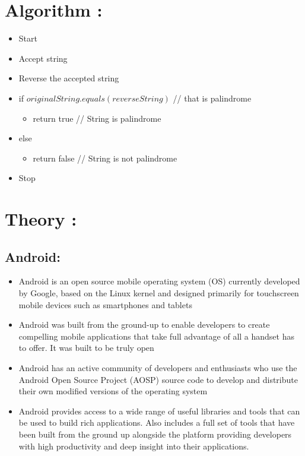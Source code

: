\documentclass{article}
\begin{document}
\section{Algorithm : }
	\begin{itemize}
		\item Start
        \item Accept string
        \item Reverse the accepted string
        \item if $originalString.equals(reverseString)$ // that is palindrome
        	\begin{itemize}
					\item return  true // String is palindrome
			\end{itemize}
        \item else
        	\begin{itemize}
					\item return  false // String is not palindrome
			\end{itemize}
        \item Stop
	\end{itemize}


\section{Theory : }
 	
\subsection{Android:}
	\begin{itemize}
		\item Android is an open source mobile operating system (OS) currently developed by Google, based on the Linux kernel and designed primarily for touchscreen mobile devices such as smartphones and tablets
        \item Android was built from the ground-up to enable developers to create compelling mobile applications that take full advantage of all a handset has to offer. It was built to be truly open
        \item Android has an active community of developers and enthusiasts who use the Android Open Source Project (AOSP) source code to develop and distribute their own modified versions of the operating system
        \item Android provides access to a wide range of useful libraries and tools that can be used to build rich applications. Also includes a full set of tools that have been built from the ground up alongside the platform providing developers with high productivity and deep insight into their applications.
	\end{itemize}
\end{document}

